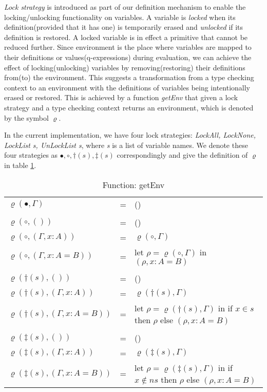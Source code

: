 \emph{Lock strategy} is introduced as part of our definition mechanism to enable the locking/unlocking functionality on variables. A variable is \emph{locked} when its definition(provided that it has one) is temporarily erased and \emph{unlocked} if its definition is restored. A locked variable is in effect a primitive that cannot be reduced further. Since environment is the place where variables are mapped to their definitions or values(q-expressions) during evaluation, we can achieve the effect of locking(unlocking) variables by removing(restoring) their definitions from(to) the environment. This suggests a transformation from a type checking context to an environment with the definitions of variables being intentionally erased or restored. This is achieved by a function \emph{getEnv} that given a lock strategy and a type checking context returns an environment, which is denoted by the symbol $\varrho$.

In the current implementation, we have four lock strategies: \emph{LockAll, LockNone, LockList s, UnLockList s}, where \emph{s} is a list of variable names. We denote these four strategies as $\bullet, \circ, \dagger(s), \ddagger(s)$ correspondingly and give the definition of $\varrho$ in table \ref{theory:tab:getEnv}.
\begin{table}[h] 
  \centering
  \begin{tabular}{l l l}
    $\varrho(\bullet, \Gamma)$ & = & () \\
    \\
    $\varrho(\circ, ())$ & = & () \\
    $\varrho(\circ, (\Gamma, x : A))$ & = & $\varrho(\circ, \Gamma)$ \\
    $\varrho(\circ, (\Gamma, x : A = B))$ & = & let $\rho = \varrho(\circ, \Gamma)$ in $(\rho, x : A = B)$ \\
    \\
    $\varrho(\dagger(s), ())$ & = & () \\
    $\varrho(\dagger(s), (\Gamma, x : A))$ & = & $\varrho(\dagger(s), \Gamma)$ \\
    $\varrho(\dagger(s), (\Gamma, x : A = B))$ & = & let $\rho = \varrho(\dagger(s), \Gamma)$ in if $x \in s$ then $\rho$ else $(\rho, x : A = B)$\\
    \\
    $\varrho(\ddagger(s), ())$ & = & () \\
    $\varrho(\ddagger(s), (\Gamma, x : A))$ & = & $\varrho(\ddagger(s), \Gamma)$ \\
    $\varrho(\ddagger(s), (\Gamma, x : A = B))$ & = & let $\rho = \varrho(\ddagger(s), \Gamma)$ in if $x \notin ns$ then $\rho$ else $(\rho, x : A = B)$
  \end{tabular}
  \caption{Function: getEnv}
  \label{theory:tab:getEnv}
\end{table}

